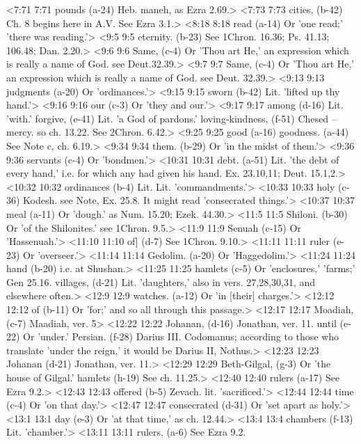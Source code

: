 <7:71 7:71  pounds (a-24)  Heb. maneh, as Ezra 2.69.>
<7:73 7:73  cities, (b-42)  Ch. 8 begins here in A.V. See Ezra 3.1.>
<8:18 8:18  read (a-14)  Or 'one read;' 'there was reading.'>
<9:5 9:5  eternity. (b-23)  See 1Chron. 16.36; Ps. 41.13; 106.48; Dan. 2.20.>
<9:6 9:6  Same, (c-4) Or 'Thou art He,' an expression which is really a name of God. see Deut.32.39.>
<9:7 9:7  Same, (c-4)  Or 'Thou art He,' an expression which is really a name of  God. see Deut. 32.39.>
<9:13 9:13  judgments (a-20)  Or 'ordinances.'>
<9:15 9:15  sworn (b-42)  Lit. 'lifted up thy hand.'>
<9:16 9:16  our (c-3)  Or 'they and our.'>
<9:17 9:17  among (d-16)  Lit. 'with.'
  forgive, (e-41)  Lit. 'a God of pardons.'
  loving-kindness, (f-51)  Chesed -- mercy. so ch. 13.22. See 2Chron. 6.42.>
<9:25 9:25  good (a-16)  goodness. (a-44)
  See Note c, ch. 6.19.>
<9:34 9:34  them. (b-29)  Or 'in the midst of them.'>
<9:36 9:36  servants (c-4)  Or 'bondmen.'>
<10:31 10:31  debt. (a-51)  Lit. 'the debt of every hand,' i.e. for which any had given  his hand. Ex. 23.10,11; Deut. 15.1,2.>
<10:32 10:32  ordinances (b-4)  Lit. Lit. 'commandments.'>
<10:33 10:33  holy (c-36)  Kodesh. see Note, Ex. 25.8. It might read 'consecrated  things.'>
<10:37 10:37  meal (a-11)  Or 'dough.' as Num. 15.20; Ezek. 44.30.>
<11:5 11:5  Shiloni. (b-30)  Or 'of the Shilonites.' see 1Chron. 9.5.>
<11:9 11:9  Senuah (c-15)  Or 'Hassenuah.'>
<11:10 11:10  of] (d-7)  See 1Chron. 9.10.>
<11:11 11:11  ruler (e-23)  Or 'overseer.'>
<11:14 11:14  Gedolim. (a-20)  Or 'Haggedolim.'>
<11:24 11:24  hand (b-20)  i.e. at Shushan.>
<11:25 11:25  hamlets (c-5)  Or 'enclosures,' 'farms;' Gen 25.16.
  villages, (d-21)  Lit. 'daughters,' also in vers. 27,28,30,31, and elsewhere  often.>
<12:9 12:9  watches. (a-12)  Or 'in [their] charges.'>
<12:12 12:12  of (b-11)  Or 'for;' and so all through this passage.>
<12:17 12:17  Moadiah, (c-7)  Maadiah, ver. 5>
<12:22 12:22  Johanan, (d-16) Jonathan, ver. 11.
  until (e-22)  Or 'under.'
  Persian. (f-28)  Darius III. Codomanus; according to those who translate  'under the reign,' it would be Darius II, Nothus.>
<12:23 12:23  Johanan (d-21)  Jonathan, ver. 11.>
<12:29 12:29  Beth-Gilgal, (g-3)  Or 'the house of Gilgal.'
  hamlets (h-19)  See ch. 11.25.>
<12:40 12:40  rulers (a-17)  See Ezra 9.2.>
<12:43 12:43  offered (b-5)  Zevach. lit. 'sacrificed.'>
<12:44 12:44  time (c-4)  Or 'on that day.'>
<12:47 12:47  consecrated (d-31)  Or 'set apart as holy.'>
<13:1 13:1  day (e-3)  Or 'at that time,' as ch. 12.44.>
<13:4 13:4  chambers (f-13)  Lit. 'chamber.'>
<13:11 13:11  rulers, (a-6)  See Ezra 9.2.
